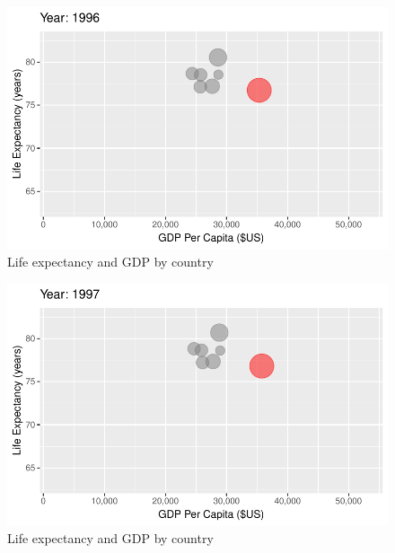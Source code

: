 \documentclass[
  letterpaper,
  DIV=11,
  numbers=noendperiod]{scrreport}
\theoremstyle{definition}
\theoremstyle{remark}
\begin{document}
\begin{figure}

{\centering \includegraphics{index_files/figure-pdf/fig-anim-country-81.pdf}

}

\caption{\label{fig-anim-country-81}Life expectancy and GDP by country}

\end{figure}

\begin{figure}

{\centering \includegraphics{index_files/figure-pdf/fig-anim-country-82.pdf}

}

\caption{\label{fig-anim-country-82}Life expectancy and GDP by country}

\end{figure}
\end{document}
